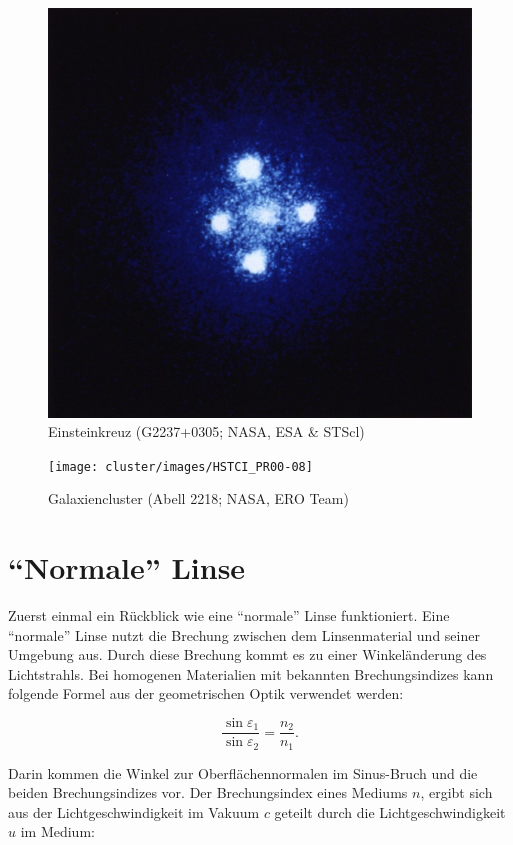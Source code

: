\begin{refsection}
\begin{figure}
  \centering
  \includegraphics[width=.7\textwidth]{cluster/images/Einstein_cross}
  \caption{Einsteinkreuz (G2237+0305; NASA, ESA \& STScl)
    \cite{wiki:einsteinkreuz}}
  \label{fig:einsteinkreuz}
\end{figure}

\begin{figure}
  \centering
  \texttt{[image: cluster/images/HSTCI\_PR00-08]}
  \caption{Galaxiencluster (Abell 2218; NASA, ERO Team)
    \cite{wiki:abell}}
  \label{fig:abell}
\end{figure}

\section{``Normale'' Linse}
Zuerst einmal ein Rückblick wie eine ``normale'' Linse funktioniert.
Eine ``normale'' Linse nutzt die Brechung zwischen dem Linsenmaterial
und seiner Umgebung aus.  Durch diese Brechung kommt es zu einer
Winkeländerung des Lichtstrahls.  Bei homogenen Materialien mit
bekannten Brechungsindizes kann folgende Formel aus der geometrischen
Optik verwendet werden:

\begin{equation}
  \frac{\sin \varepsilon_1}{\sin \varepsilon_2} = \frac{n_2}{n_1}.
\end{equation}

Darin kommen die Winkel zur Oberflächennormalen im Sinus-Bruch
und die beiden Brechungsindizes vor.  Der
Brechungsindex eines Mediums \(n\), ergibt sich aus der
Lichtgeschwindigkeit im Vakuum \(c\) geteilt durch die
Lichtgeschwindigkeit \(u\) im Medium:


\end{refsection}

